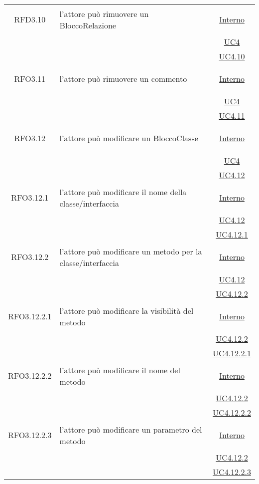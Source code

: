 \begin{longtable}{|c|>{\centering}m{7cm}|c|}
\hypertarget{RFD3.10}{RFD3.10} & l'attore può rimuovere un BloccoRelazione &  \hyperlink{Interno}{Interno}\\
& &\hyperref[UC4]{UC4}\\
& &\hyperref[UC4.10]{UC4.10}\\ \hline

\hypertarget{RFO3.11}{RFO3.11} & l'attore può rimuovere un commento &  \hyperlink{Interno}{Interno}\\
& &\hyperref[UC4]{UC4}\\
& &\hyperref[UC4.11]{UC4.11}\\ \hline
\hypertarget{RFO3.12}{RFO3.12} & l'attore può modificare un BloccoClasse &  \hyperlink{Interno}{Interno}\\
& &\hyperref[UC4]{UC4}\\
& &\hyperref[UC4.12]{UC4.12}\\ \hline

\hypertarget{RFO3.12.1}{RFO3.12.1} & l'attore può modificare il nome della classe/interfaccia & \hyperlink{Interno}{Interno}\\
& &\hyperref[UC4.12]{UC4.12}\\
& &\hyperref[UC4.12.1]{UC4.12.1}\\ \hline

\hypertarget{RFO3.12.2}{RFO3.12.2} & l'attore può modificare un metodo per la classe/interfaccia & \hyperlink{Interno}{Interno}\\
& &\hyperref[UC4.12]{UC4.12}\\
& &\hyperref[UC4.12.2]{UC4.12.2}\\ \hline

\hypertarget{RFO3.12.2.1}{RFO3.12.2.1} & l'attore può modificare la visibilità del metodo & \hyperlink{Interno}{Interno}\\
& &\hyperref[UC4.12.2]{UC4.12.2}\\
& &\hyperref[UC4.12.2.1]{UC4.12.2.1}\\ \hline

\hypertarget{RFO3.12.2.2}{RFO3.12.2.2} & l'attore può modificare il nome del metodo & \hyperlink{Interno}{Interno}\\
& &\hyperref[UC4.12.2]{UC4.12.2}\\
& &\hyperref[UC4.12.2.2]{UC4.12.2.2}\\ \hline

\hypertarget{RFO3.12.2.3}{RFO3.12.2.3} & l'attore può modificare un parametro del metodo & \hyperlink{Interno}{Interno}\\
& &\hyperref[UC4.12.2]{UC4.12.2}\\
& &\hyperref[UC4.12.2.3]{UC4.12.2.3}\\ \hline


\end{longtable}
